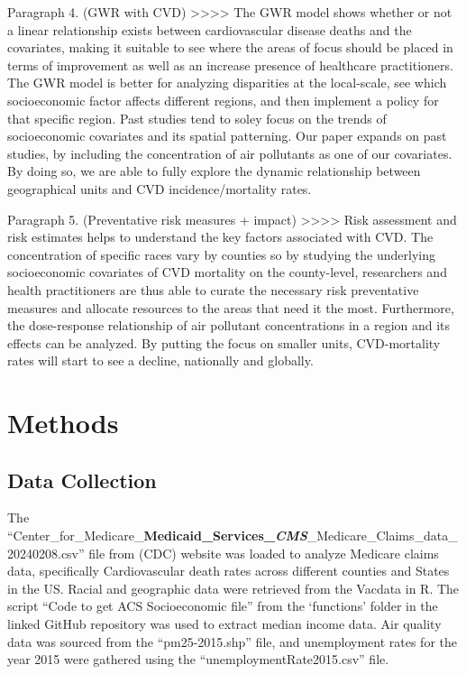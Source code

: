 \documentclass[
]{article}
\begin{document}
Paragraph 4. (GWR with CVD)
\textgreater\textgreater\textgreater\textgreater{} The GWR model shows
whether or not a linear relationship exists between cardiovascular
disease deaths and the covariates, making it suitable to see where the
areas of focus should be placed in terms of improvement as well as an
increase presence of healthcare practitioners. The GWR model is better
for analyzing disparities at the local-scale, see which socioeconomic
factor affects different regions, and then implement a policy for that
specific region. Past studies tend to soley focus on the trends of
socioeconomic covariates and its spatial patterning. Our paper expands
on past studies, by including the concentration of air pollutants as one
of our covariates. By doing so, we are able to fully explore the dynamic
relationship between geographical units and CVD incidence/mortality
rates.

Paragraph 5. (Preventative risk measures + impact)
\textgreater\textgreater\textgreater\textgreater{} Risk assessment and
risk estimates helps to understand the key factors associated with CVD.
The concentration of specific races vary by counties so by studying the
underlying socioeconomic covariates of CVD mortality on the
county-level, researchers and health practitioners are thus able to
curate the necessary risk preventative measures and allocate resources
to the areas that need it the most. Furthermore, the dose-response
relationship of air pollutant concentrations in a region and its effects
can be analyzed. By putting the focus on smaller units, CVD-mortality
rates will start to see a decline, nationally and globally.

\section{Methods}\label{methods}

\subsection{Data Collection}\label{data-collection}

The
``Center\_for\_Medicare\_\textbf{Medicaid\_Services\_\emph{CMS}}\_Medicare\_Claims\_data\_20240208.csv''
file from (CDC) website was loaded to analyze Medicare claims data,
specifically Cardiovascular death rates across different counties and
States in the US. Racial and geographic data were retrieved from the
Vacdata in R. The script ``Code to get ACS Socioeconomic file'' from the
`functions' folder in the linked GitHub repository was used to extract
median income data. Air quality data was sourced from the
``pm25-2015.shp'' file, and unemployment rates for the year 2015 were
gathered using the ``unemploymentRate2015.csv'' file.
\end{document}
